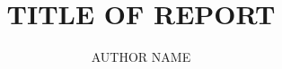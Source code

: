 \title{TITLE OF REPORT}
\author{AUTHOR NAME}
\usepackage{amsmath}
\usepackage{amsfonts}
\usepackage{amssymb}
\usepackage[margin=1in,paper=letterpaper,includeheadfoot]{geometry}
\usepackage{fancyhdr}
\pagestyle{fancy}
\usepackage{varioref}
\usepackage{color}
\usepackage[pdfborder=0, colorlinks=true, urlcolor=blue, linkcolor=mygrey]{hyperref}

